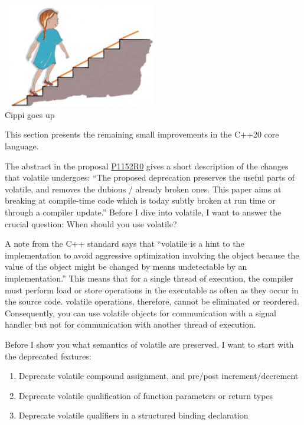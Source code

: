 \begin{center}
\includegraphics[width=0.5\textwidth]{content/3/chapter4/images/47.png}\\
Cippi goes up
\end{center}

This section presents the remaining small improvements in the C++20 core language.


The abstract in the proposal \href{http://www.open-std.org/jtc1/sc22/wg21/docs/papers/2018/p1152r0.html}{P1152R0} gives a short description of the changes that volatile undergoes: “The proposed deprecation preserves the useful parts of volatile, and removes the dubious / already broken ones. This paper aims at breaking at compile-time code which is today subtly broken at run time or through a compiler update.” Before I dive into volatile, I want to answer the crucial question: When should you use volatile?

A note from the C++ standard says that “volatile is a hint to the implementation to avoid aggressive optimization involving the object because the value of the object might be changed by means undetectable by an implementation.” This means that for a single thread of execution, the compiler must perform load or store operations in the executable as often as they occur in the source code. volatile operations, therefore, cannot be eliminated or reordered. Consequently, you can use volatile objects for communication with a signal handler but not for communication with another thread of execution.

Before I show you what semantics of volatile are preserved, I want to start with the deprecated features:

\begin{enumerate}
\item 
Deprecate volatile compound assignment, and pre/post increment/decrement

\item 
Deprecate volatile qualification of function parameters or return types

\item 
Deprecate volatile qualifiers in a structured binding declaration
\end{enumerate}

